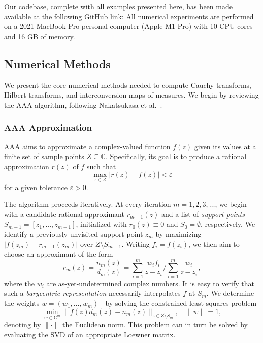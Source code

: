 \documentclass{cams-l} %
\newcommand{\CC}{\mathbb C}
\newcommand{\eps}{\varepsilon}
\theoremstyle{definition}
\theoremstyle{remark}
\numberwithin{equation}{section}
\begin{document}
Our codebase, complete with all examples presented here, has been made available at the following GitHub link:
\ourgithublink
All numerical experiments are performed on a 2021 MacBook Pro personal computer (Apple M1 Pro) with 10 CPU cores and 16 GB of memory.

\davebegin
\subsection{Numerical Methods}\label{sec:B_implem}
We present the core numerical methods needed to compute Cauchy transforms, Hilbert transforms, and interconversion maps of measures. We begin by reviewing the AAA algorithm, following Nakatsukasa et al.~\cite{nakatsukasa2018aaa}.

\subsubsection{AAA Approximation}

AAA aims to approximate a complex-valued function $f(z)$ given its values at a finite set of sample points $Z \subseteq \CC$. Specifically, its goal is to produce a rational approximation $r(z)$ of $f$ such that
\begin{equation}\label{eq:AAA_tolerance}
    \max_{z\in Z}|r(z)-f(z)|<\eps
\end{equation}
for a given tolerance $\eps>0$.

The algorithm proceeds iteratively. At every iteration $m = 1, 2, 3, \dots$, we begin with a candidate rational approximant $r_{m-1}(z)$ and a list of \emph{support points} $S_{m-1} = [z_1,...,z_{m-1}]$, initialized with $r_0(z)\equiv 0$ and $S_0 =\emptyset$, respectively. We identify a previously-unvisited support point $z_m$ by maximizing $|f(z_m)-r_{m-1}(z_m)|$ over $Z\setminus S_{m-1}$. Writing $f_i = f(z_i)$, we then aim to choose an approximant of the form
\begin{equation}\label{eq:bary}
    r_m(z) = \frac{n_m(z)}{d_m(z)} = \sum_{i=1}^m \frac{w_if_i}{z - z_i} \Big/ \sum_{i=1}^m \frac{w_i}{z - z_i},
\end{equation}
where the $w_i$ are as-yet-undetermined complex numbers. It is easy to verify that such a \textit{barycentric representation} necessarily interpolates $f$ at $S_m$. We determine the weights $w = (w_1, \dots, w_m)^\top$ by solving the constrained least-squares problem
\begin{equation}
    \min_{w \in \CC^{m}} \|f(z)d_m(z) - n_m(z)\|_{z\in Z \setminus S_m}, \quad \|w\| = 1,
\end{equation}
denoting by $\|\cdot\|$ the Euclidean norm. This problem can in turn be solved by evaluating the SVD of an appropriate Loewner matrix. 
\end{document}
